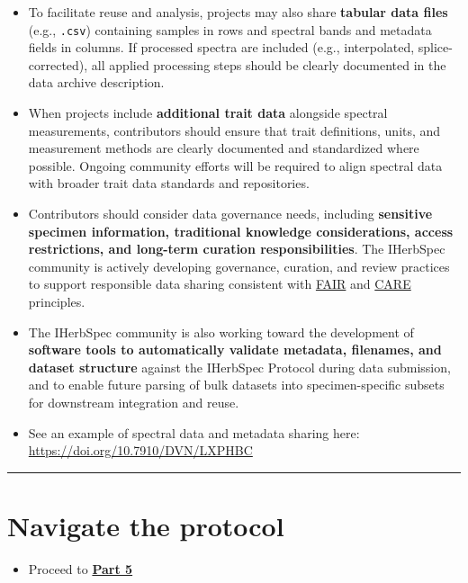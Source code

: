 \documentclass[
  letterpaper,
  DIV=11,
  numbers=noendperiod]{scrreprt}
\providecommand{\tightlist}{%
  \setlength{\itemsep}{0pt}\setlength{\parskip}{0pt}}
\begin{document}
\begin{itemize}
  associated with spectral data while the files themselves remain hosted
  in the most appropriate repository.
\item
  To facilitate reuse and analysis, projects may also share
  \textbf{tabular data files} (e.g., \texttt{.csv}) containing samples
  in rows and spectral bands and metadata fields in columns. If
  processed spectra are included (e.g., interpolated, splice-corrected),
  all applied processing steps should be clearly documented in the data
  archive description.
\item
  When projects include \textbf{additional trait data} alongside
  spectral measurements, contributors should ensure that trait
  definitions, units, and measurement methods are clearly documented and
  standardized where possible. Ongoing community efforts will be
  required to align spectral data with broader trait data standards and
  repositories.
\item
  Contributors should consider data governance needs, including
  \textbf{sensitive specimen information, traditional knowledge
  considerations, access restrictions, and long-term curation
  responsibilities}. The IHerbSpec community is actively developing
  governance, curation, and review practices to support responsible data
  sharing consistent with
  \href{https://www.nature.com/articles/sdata201618}{FAIR} and
  \href{https://www.gida-global.org/care}{CARE} principles.
\item
  The IHerbSpec community is also working toward the development of
  \textbf{software tools to automatically validate metadata, filenames,
  and dataset structure} against the IHerbSpec Protocol during data
  submission, and to enable future parsing of bulk datasets into
  specimen-specific subsets for downstream integration and reuse.
\item
  See an example of spectral data and metadata sharing here:\\
  \url{https://doi.org/10.7910/DVN/LXPHBC}
\end{itemize}

\begin{center}\rule{0.5\linewidth}{0.5pt}\end{center}

\section{Navigate the protocol}\label{navigate-the-protocol-4}

\begin{itemize}
\tightlist
\item
  Proceed to \hyperref[part5]{\textbf{Part 5}}
\end{itemize}
\end{document}
